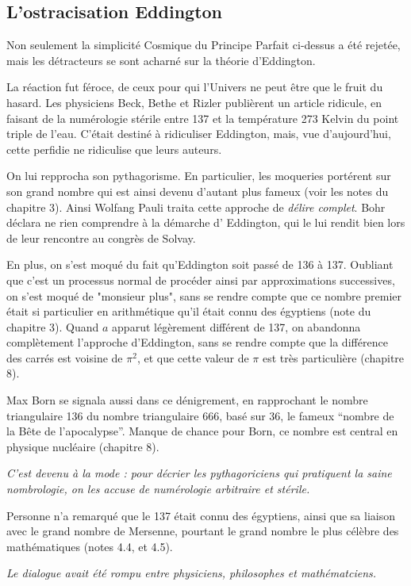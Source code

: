 \documentclass[a4paper,12pt]{article}
\begin{document}
\subsection{L'ostracisation Eddington}
Non seulement la simplicité Cosmique du Principe Parfait ci-dessus a été rejetée, mais les détracteurs se sont acharné sur la théorie d'Eddington.

La réaction fut féroce, de ceux pour qui l'Univers ne peut être que le fruit du hasard. Les physiciens Beck, Bethe et Rizler publièrent un article ridicule, en faisant de la numérologie stérile entre 137 et la température 273 Kelvin du point triple de l'eau. C'était destiné à ridiculiser Eddington, mais, vue d'aujourd'hui, cette perfidie ne ridiculise que leurs auteurs.

On lui repprocha son pythagorisme. En particulier, les moqueries portérent sur son grand nombre qui est ainsi devenu d'autant plus fameux (voir les notes du chapitre 3). Ainsi Wolfang Pauli traita cette approche de \textit{délire complet}. Bohr déclara ne rien comprendre à la démarche d' Eddington, qui le lui rendit bien lors de leur rencontre au congrès de Solvay.

En plus, on s'est moqué du fait qu'Eddington soit passé de 136 à 137. Oubliant que c'est un processus normal de procéder ainsi par approximations successives, on s'est moqué de "monsieur plus", sans se rendre compte que ce nombre premier était si particulier en arithmétique qu'il était connu des égyptiens (note du chapitre 3). Quand $a$ apparut légèrement différent de 137, on abandonna complètement l'approche d'Eddington, sans se rendre compte que la différence des carrés est voisine de $\pi^2$, et que cette valeur de $\pi$ est très particulière (chapitre 8).
 
Max Born se signala aussi dans ce dénigrement, en rapprochant le nombre triangulaire 136 du nombre triangulaire 666, basé sur 36, le fameux ``nombre de la Bête de l'apocalypse''. Manque de chance pour Born, ce nombre est central en physique nucléaire (chapitre 8). 

\textit{C'est devenu à la mode : pour décrier les pythagoriciens qui pratiquent la saine nombrologie, on les accuse de numérologie arbitraire et stérile.}

Personne n'a remarqué que le 137 était connu des égyptiens, ainsi que sa liaison avec le grand nombre de Mersenne, pourtant le grand nombre le plus célèbre des mathématiques (notes 4.4, et 4.5). 


\textit{Le dialogue avait été rompu entre physiciens, philosophes et mathématciens.}
\end{document}
